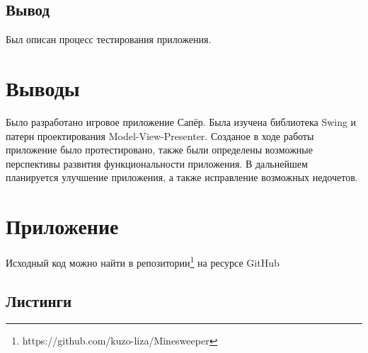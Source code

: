 \subsection{Вывод}

Был описан процесс тестирования приложения.

\section{Выводы}

Было разработано игровое приложение Сапёр. Была изучена библиотека Swing и патерн проектирования Model-View-Presenter. Созданое в ходе работы приложение было протестировано, также были определены возможные перспективы развития функциональности приложения. В дальнейшем планируется улучшение приложения, а также исправление возможных недочетов.

\section{Приложение}

Исходный код можно найти в репозитории\footnote{https://github.com/kuzo-liza/Minesweeper} на ресурсе GitHub

\subsection{Листинги}









 
